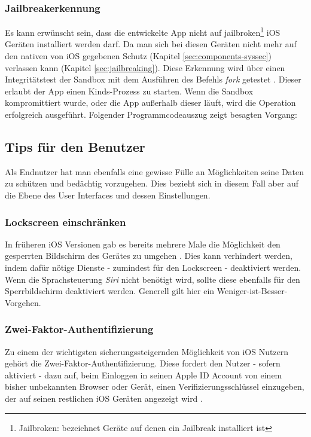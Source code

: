 		\subsubsection{Jailbreakerkennung}
			Es kann erwünscht sein, dass die entwickelte App nicht auf
			jailbroken\footnote{Jailbroken: bezeichnet Geräte auf denen ein Jailbreak
			installiert ist} iOS Geräten installiert werden darf.
			Da man sich bei diesen Geräten nicht mehr auf den nativen von iOS gegebenen Schutz (Kapitel
			\ref{sec:components-syssec}) verlassen kann (Kapitel \ref{sec:jailbreaking}).
			Diese Erkennung wird über einen Integritätstest der Sandbox mit dem
			Ausführen des Befehls \textsl{fork} getestet \cite[S.328]{Zdziarski2012}.
			Dieser erlaubt der App einen Kinds-Prozess zu starten. Wenn die Sandbox
			kompromittiert wurde, oder die App außerhalb dieser läuft, wird die
			Operation erfolgreich ausgeführt. Folgender Programmcodeauszug zeigt
			besagten Vorgang:
			
			
	\subsection{Tips für den Benutzer}
		Als Endnutzer hat man ebenfalls eine gewisse Fülle an Möglichkeiten seine
		Daten zu schützen und bedächtig vorzugehen. Dies bezieht sich in diesem Fall
		aber auf die Ebene des User Interfaces und dessen Einstellungen.
		\subsubsection{Lockscreen einschränken}
			In früheren iOS Versionen gab es bereits mehrere Male die Möglichkeit den
			gesperrten Bildschirm des Gerätes zu umgehen
			\cite{IOS7LockscreenBypass2013}.
			Dies kann verhindert werden, indem dafür nötige Dienste - zumindest für den
			Lockscreen - deaktiviert werden. Wenn die Sprachsteuerung \textsl{Siri} nicht benötigt
			wird, sollte diese ebenfalls für den Sperrbildschirm deaktiviert werden.
			Generell gilt hier ein Weniger-ist-Besser-Vorgehen.
		\subsubsection{Zwei-Faktor-Authentifizierung }
			Zu einem der wichtigsten sicherungssteigernden Möglichkeit von iOS Nutzern
			gehört die Zwei-Faktor-Authentifizierung. Diese fordert den Nutzer - sofern
			aktiviert - dazu auf, beim Einloggen in seinen Apple ID Account von einem
			bisher unbekannten Browser oder Gerät, einen Verifizierungsschlüssel
			einzugeben, der auf seinen restlichen iOS Geräten angezeigt
			wird \cite{AppleiOS9Preview2015}.
